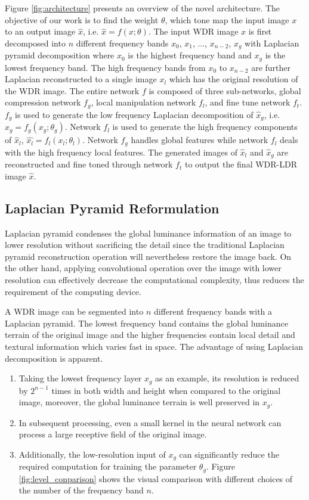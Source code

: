 \documentclass[journal]{IEEEtran}
\begin{document}
Figure \ref{fig:architecture} presents an overview of the novel architecture. The objective of our work is to find the weight $\theta$, which tone map the input image $x$ to an output image $\hat{x}$, i.e. $\hat{x} = f(x;\theta)$. The input WDR image $x$ is first decomposed into $n$ different frequency bands $x_0$, $x_1$, ..., $x_{n-2}$, $x_g$ with Laplacian pyramid decomposition where $x_0$ is the highest frequency band and $x_{g}$ is the lowest frequency band. The high frequency bands from $x_0$ to $x_{n-2}$ are further Laplacian reconstructed to a single image $x_l$ which has the original resolution of the WDR image.  The entire network $f$ is composed of three sub-networks, global compression network $f_g$,  local manipulation network $f_l$, and fine tune network $f_t$. $f_g$ is used to generate the low frequency Laplacian decomposition of $\hat{x}_g$, i.e.  $\hat{x}_g = f_g(x_g;\theta_g)$. Network $f_l$ is used to generate the high frequency components of $\hat{x}_l$, $\hat{x_l} = f_l(x_l;\theta_l)$. 
Network $f_g$ handles global features while network $f_l$ deals with the high frequency local features. The generated images of $\hat{x}_l$ and $\hat{x}_g$ are reconstructed and fine toned through network $f_t$ to output the final WDR-LDR image $\hat{x}$.


\subsection{Laplacian Pyramid Reformulation}
\label{sect:lap_py}
Laplacian pyramid condenses the global luminance information of an image to lower resolution without sacrificing the detail since the traditional Laplacian pyramid reconstruction operation will nevertheless restore the image back. On the other hand, applying convolutional operation over the image with lower resolution can effectively decrease the computational complexity, thus reduces the requirement of the computing device.

A WDR image can be segmented into $n$ different frequency bands with a Laplacian pyramid. The lowest frequency band contains the global luminance terrain of the original image and the higher frequencies contain local detail and textural information which varies fast in space.  The advantage of using Laplacian decomposition is apparent. 
\begin{enumerate} 
\item Taking the lowest frequency layer $x_g$ as an example, its resolution is reduced by $2^{n-1}$ times in both width and height when compared to the original image, moreover, the global luminance terrain is well preserved in $x_g$. 
\item In subsequent processing, even a small kernel in the neural network can process a large receptive field of the original image. 
\item Additionally, the low-resolution input of $x_g$ can significantly reduce the required computation for training the parameter $\theta_g$.  Figure \ref{fig:level_conparison} shows the visual comparison with different choices of the number of the frequency band $n$.
\end{enumerate}
\end{document}

